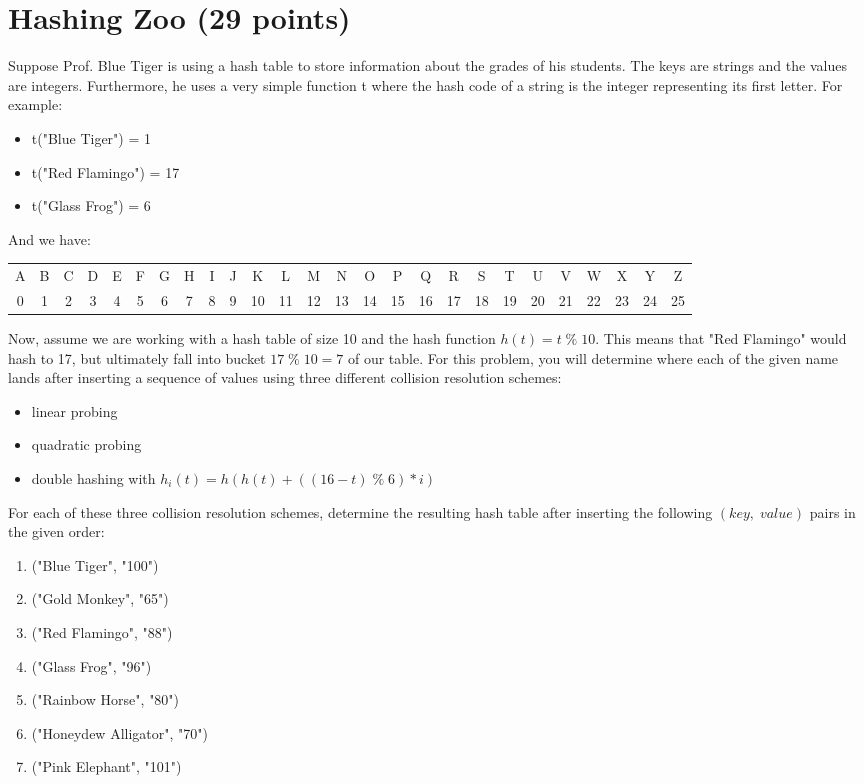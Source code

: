 \documentclass[11pt]{exam}
\begin{document}
\section{Hashing Zoo (29 points)}
Suppose Prof. Blue Tiger is using a hash table to store information about the grades of his students. The keys are strings and the values are integers. Furthermore, he uses a very simple function t where the hash code of a string is the integer representing its first letter. For example:
\begin{itemize}
    \item t("Blue Tiger") = 1
    \item t("Red Flamingo") = 17
    \item t("Glass Frog") = 6
\end{itemize}

And we have:
\begin{table}[H]
    \centering
    \setlength{\tabcolsep}{1mm}
    \begin{tabular}{cccccccccccccccccccccccccc}
        A & B & C & D & E & F & G & H & I & J & K  & L  & M  & N  & O  & P  & Q  & R  & S  & T  & U  & V  & W  & X  & Y  & Z  \\
        0 & 1 & 2 & 3 & 4 & 5 & 6 & 7 & 8 & 9 & 10 & 11 & 12 & 13 & 14 & 15 & 16 & 17 & 18 & 19 & 20 & 21 & 22 & 23 & 24 & 25
    \end{tabular}
\end{table}
Now, assume we are working with a hash table of size 10 and the hash function $h(t) = t \;\%\; 10$. This means that "Red Flamingo" would hash to 17, but ultimately fall into bucket $17 \;\%\; 10 = 7$ of our table. For this problem, you will determine where each of the given name lands after inserting a sequence of values using three different collision resolution schemes:

\begin{itemize}
    \item linear probing
    \item quadratic probing
    \item double hashing with $h_i(t) = h(h(t)+((16-t)\;\%\; 6) * i)$
\end{itemize}

For each of these three collision resolution schemes, determine the resulting hash table after inserting the following $(key,\;value)$ pairs in the given order:
\begin{enumerate}[1.]
    \item ("Blue Tiger", "100")
    \item ("Gold Monkey", "65")
    \item ("Red Flamingo", "88")
    \item ("Glass Frog", "96")
    \item ("Rainbow Horse", "80")
    \item ("Honeydew Alligator", "70")
    \item ("Pink Elephant", "101")

\end{enumerate}
\end{document}

